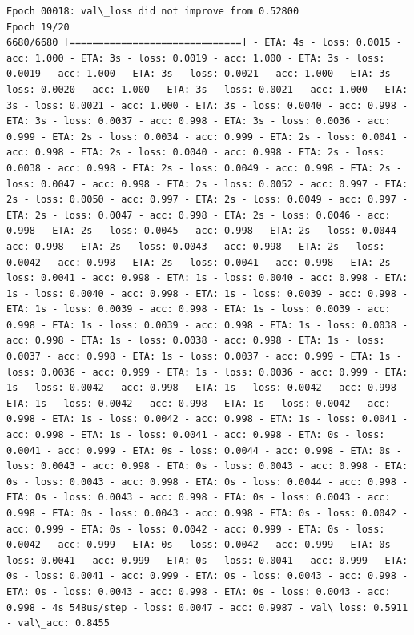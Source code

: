 \documentclass[11pt]{article}
\begin{document}
\begin{Verbatim}[commandchars=\\\{\}]
Epoch 00018: val\_loss did not improve from 0.52800
Epoch 19/20
6680/6680 [==============================] - ETA: 4s - loss: 0.0015 - acc: 1.000 - ETA: 3s - loss: 0.0019 - acc: 1.000 - ETA: 3s - loss: 0.0019 - acc: 1.000 - ETA: 3s - loss: 0.0021 - acc: 1.000 - ETA: 3s - loss: 0.0020 - acc: 1.000 - ETA: 3s - loss: 0.0021 - acc: 1.000 - ETA: 3s - loss: 0.0021 - acc: 1.000 - ETA: 3s - loss: 0.0040 - acc: 0.998 - ETA: 3s - loss: 0.0037 - acc: 0.998 - ETA: 3s - loss: 0.0036 - acc: 0.999 - ETA: 2s - loss: 0.0034 - acc: 0.999 - ETA: 2s - loss: 0.0041 - acc: 0.998 - ETA: 2s - loss: 0.0040 - acc: 0.998 - ETA: 2s - loss: 0.0038 - acc: 0.998 - ETA: 2s - loss: 0.0049 - acc: 0.998 - ETA: 2s - loss: 0.0047 - acc: 0.998 - ETA: 2s - loss: 0.0052 - acc: 0.997 - ETA: 2s - loss: 0.0050 - acc: 0.997 - ETA: 2s - loss: 0.0049 - acc: 0.997 - ETA: 2s - loss: 0.0047 - acc: 0.998 - ETA: 2s - loss: 0.0046 - acc: 0.998 - ETA: 2s - loss: 0.0045 - acc: 0.998 - ETA: 2s - loss: 0.0044 - acc: 0.998 - ETA: 2s - loss: 0.0043 - acc: 0.998 - ETA: 2s - loss: 0.0042 - acc: 0.998 - ETA: 2s - loss: 0.0041 - acc: 0.998 - ETA: 2s - loss: 0.0041 - acc: 0.998 - ETA: 1s - loss: 0.0040 - acc: 0.998 - ETA: 1s - loss: 0.0040 - acc: 0.998 - ETA: 1s - loss: 0.0039 - acc: 0.998 - ETA: 1s - loss: 0.0039 - acc: 0.998 - ETA: 1s - loss: 0.0039 - acc: 0.998 - ETA: 1s - loss: 0.0039 - acc: 0.998 - ETA: 1s - loss: 0.0038 - acc: 0.998 - ETA: 1s - loss: 0.0038 - acc: 0.998 - ETA: 1s - loss: 0.0037 - acc: 0.998 - ETA: 1s - loss: 0.0037 - acc: 0.999 - ETA: 1s - loss: 0.0036 - acc: 0.999 - ETA: 1s - loss: 0.0036 - acc: 0.999 - ETA: 1s - loss: 0.0042 - acc: 0.998 - ETA: 1s - loss: 0.0042 - acc: 0.998 - ETA: 1s - loss: 0.0042 - acc: 0.998 - ETA: 1s - loss: 0.0042 - acc: 0.998 - ETA: 1s - loss: 0.0042 - acc: 0.998 - ETA: 1s - loss: 0.0041 - acc: 0.998 - ETA: 1s - loss: 0.0041 - acc: 0.998 - ETA: 0s - loss: 0.0041 - acc: 0.999 - ETA: 0s - loss: 0.0044 - acc: 0.998 - ETA: 0s - loss: 0.0043 - acc: 0.998 - ETA: 0s - loss: 0.0043 - acc: 0.998 - ETA: 0s - loss: 0.0043 - acc: 0.998 - ETA: 0s - loss: 0.0044 - acc: 0.998 - ETA: 0s - loss: 0.0043 - acc: 0.998 - ETA: 0s - loss: 0.0043 - acc: 0.998 - ETA: 0s - loss: 0.0043 - acc: 0.998 - ETA: 0s - loss: 0.0042 - acc: 0.999 - ETA: 0s - loss: 0.0042 - acc: 0.999 - ETA: 0s - loss: 0.0042 - acc: 0.999 - ETA: 0s - loss: 0.0042 - acc: 0.999 - ETA: 0s - loss: 0.0041 - acc: 0.999 - ETA: 0s - loss: 0.0041 - acc: 0.999 - ETA: 0s - loss: 0.0041 - acc: 0.999 - ETA: 0s - loss: 0.0043 - acc: 0.998 - ETA: 0s - loss: 0.0043 - acc: 0.998 - ETA: 0s - loss: 0.0043 - acc: 0.998 - 4s 548us/step - loss: 0.0047 - acc: 0.9987 - val\_loss: 0.5911 - val\_acc: 0.8455


\end{Verbatim}
\end{document}
